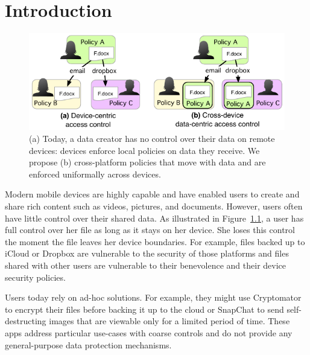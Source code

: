 
\chapter{Introduction}
\label{ch:Introduction}

\begin{figure}
    \centering
    \includegraphics[width=\columnwidth]{fig/tcapsules-contrast2.pdf}
    \caption{(a) Today, a data creator has no control over their data on remote
      devices: devices enforce local policies on data they receive. We propose (b)
      cross-platform policies that move with data and are enforced uniformally
      across devices.}
    \label{fig:ControlBoundaries}
  \end{figure}
  
  Modern mobile devices are highly capable and have enabled users to create and
  share rich content such as videos, pictures, and documents. However, users often
  have little control over their shared data. As illustrated in
  Figure~\ref{fig:ControlBoundaries}, a user has full control over her file as
  long as it stays on her device. She loses this control the moment the file
  leaves her device boundaries. For example, files backed up to iCloud or Dropbox
  are vulnerable to the security of those platforms and files shared with other
  users are vulnerable to their benevolence and their device security policies.
  
  Users today rely on ad-hoc solutions. For example, they might use
  Cryptomator to encrypt their files before backing it up to the cloud
  or SnapChat to send self-destructing images that are viewable only for
  a limited period of time. These apps address particular use-cases with
  coarse controls and do not provide any general-purpose data protection
  mechanisms.
  

